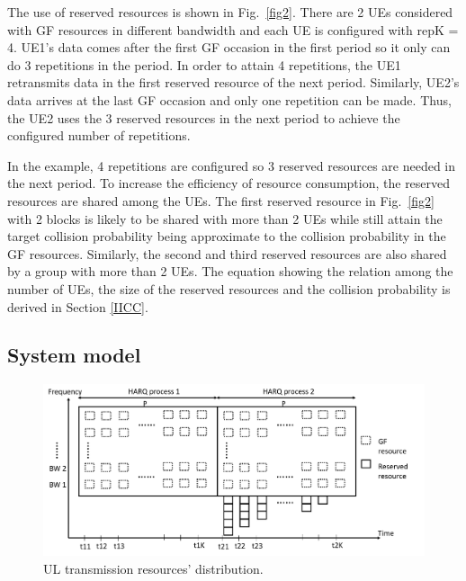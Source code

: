 \documentclass[conference]{IEEEtran}
\begin{document}
The use of reserved resources is shown in Fig.~\ref{fig2}. There are 2 UEs considered with GF resources in different bandwidth and each UE is configured with repK = 4. UE1's data comes after the first GF occasion in the first period so it only can do 3 repetitions in the period. In order to attain 4 repetitions, the UE1 retransmits data in the first reserved resource of the next period. Similarly, UE2's data arrives at the last GF occasion and only one repetition can be made. Thus, the UE2 uses the 3 reserved resources in the next period to achieve the configured number of repetitions.

In the example, 4 repetitions are configured so 3 reserved resources are needed in the next period. To increase the efficiency of resource consumption, the reserved resources are shared among the UEs. The first reserved resource in Fig.~\ref{fig2} with 2 blocks is likely to be shared with more than 2 UEs while still attain the target collision probability being approximate to the collision probability in the GF resources. Similarly, the second and third reserved resources are also shared by a group with more than 2 UEs. The equation showing the relation among the number of UEs, the size of the reserved resources and the collision probability is derived in Section \ref{IICC}.

\subsection{System model}\label{IIBB}

\begin{figure}[htbp]
\centerline{\includegraphics[scale=0.25]{fig3.png}}
\caption{UL transmission resources' distribution.}
\label{fig3}
\end{figure}
\end{document}
